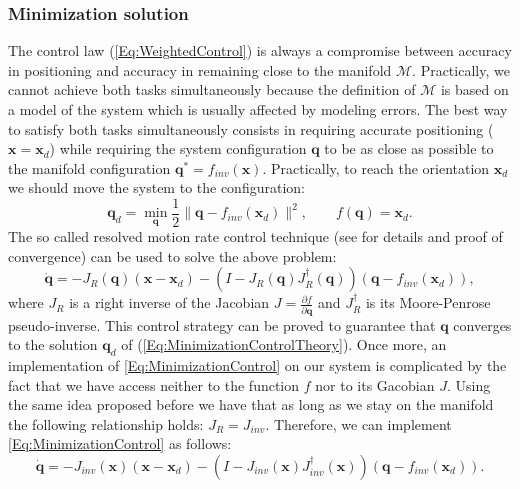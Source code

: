 \documentclass[conference]{IEEEtran}
\numberwithin{equation}{section}
\newcommand{\q}{\mathbf{q}}
\newcommand{\x}{\mathbf{x}}
\begin{document}
\subsubsection{Minimization solution} \label{Sec:MinimizationSolution}

The control law (\ref{Eq:WeightedControl}) is always a compromise between accuracy in positioning and accuracy in remaining close to the manifold $\mathcal M$. Practically, we cannot achieve both tasks simultaneously because the definition of $\mathcal M$ is based on a model of the system which is usually affected by modeling errors. The best way to satisfy both tasks simultaneously consists in requiring accurate positioning ($\x=\x_d$) while requiring the system configuration $\q$ to be as close as possible to the manifold configuration $\q^* = f_{inv}(\x)$. Practically, to reach the orientation $\x_d$ we should move the system to the configuration:
\begin{equation} \label{Eq:MinimizationControlTheory}
\q_d = \min_{\q} \frac{1}{2}\| \q - f_{inv}(\x_d)\|^2, \qquad f(\q) = \x_d.
\end{equation}
The so called resolved motion rate control technique (see \cite{SamsonEspiau} for details and proof of convergence) can be used to solve the above problem:
\begin{equation} \label{Eq:MinimizationControl}
\dot{\q} = -J_R(\q) (\x-\x_d) - \left(I-J_R(\q) J_R^\dagger(\q)\right) \left(\q - f_{inv}(\x_d)\right),
\end{equation}
where $J_R$ is a right inverse of the Jacobian $J = \frac{\partial f}{\partial \q}$ and $J_R^\dagger$ is its Moore-Penrose pseudo-inverse. This control strategy can be proved to guarantee that $\q$ converges to the solution $\q_d$ of (\ref{Eq:MinimizationControlTheory}). Once more, an implementation of \eqref{Eq:MinimizationControl} on our system is complicated by the fact that we have access neither to the function $f$ nor to its Gacobian $J$. Using the same idea proposed before we have that as long as we stay on the manifold the following relationship holds: $J_R = J_{inv}$. Therefore, we can implement \eqref{Eq:MinimizationControl} as follows:
\begin{equation} \label{Eq:MinimizationControl2}
\dot{\q} = -J_{inv}(\x) (\x-\x_d) - \left(I-J_{inv}(\x) J_{inv}^\dagger(\x)\right) \left(\q - f_{inv}(\x_d)\right).
\end{equation}
\end{document}
